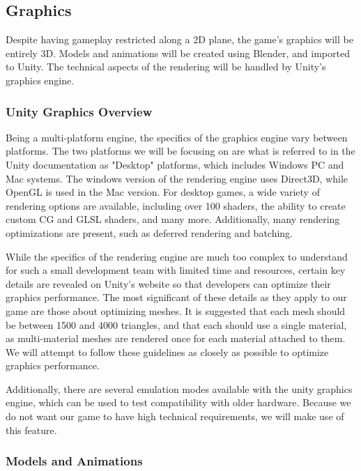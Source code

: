 \documentclass{article}
\begin{document}
\subsection{Graphics}

Despite having gameplay restricted along a 2D plane, the game's graphics will be entirely 3D.  Models and animations will be created using Blender, and imported to Unity.  The technical aspects of the rendering will be handled by Unity's graphics engine.

\subsubsection{Unity Graphics Overview}

Being a multi-platform engine, the specifics of the graphics engine vary between platforms.  The two platforms we will be focusing on are what is referred to in the Unity documentation as "Desktop" platforms, which includes Windows PC and Mac systems.  The windows version of the rendering engine uses Direct3D, while OpenGL is used in the Mac version.  For desktop games, a wide variety of rendering options are available, including over 100 shaders, the ability to create custom CG and GLSL shaders, and many more.  Additionally, many rendering optimizations are present, such as deferred rendering and batching.

While the specifics of the rendering engine are much too complex to understand for such a small development team with limited time and resources, certain key details are revealed on Unity's website so that developers can optimize their graphics performance.  The most significant of these details as they apply to our game are those about optimizing meshes.  It is suggested that each mesh should be between 1500 and 4000 triangles, and that each should use a single material, as multi-material meshes are rendered once for each material attached to them.  We will attempt to follow these guidelines as closely as possible to optimize graphics performance.

Additionally, there are several emulation modes available with the unity graphics engine, which can be used to test compatibility with older hardware.  Because we do not want our game to have high technical requirements, we will make use of this feature.

\subsubsection{Models and Animations}
\end{document}

